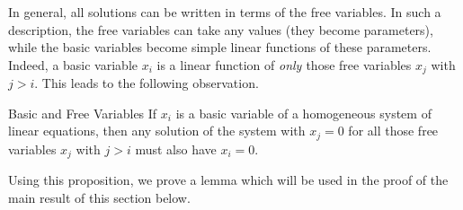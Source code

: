 In general, all solutions can be written in terms of the free variables. In such a description, the free variables can take any values (they become parameters), while the basic variables become simple linear functions of these parameters. Indeed, a basic variable $x_i$ is a linear function of {\em only \em}those free variables $x_j$ with $j>i$. This leads to the following observation.

\begin{proposition}{Basic and Free Variables}\label{prop:basicfree}
If $x_i$ is a basic variable of a homogeneous system of linear equations, then any solution of the system with $x_j=0$ for all those free variables $x_j$ with $j>i$ must also have $x_i=0$.
\end{proposition}

Using this proposition, we prove a lemma which will be used in the proof of the main result of this section below.

